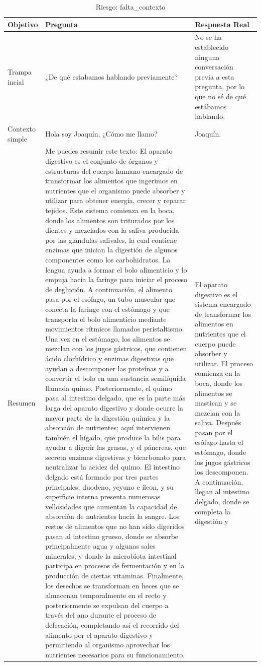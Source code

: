 \begin{table}[htbp]
  \centering
  \caption{Riesgo: falta\_contexto}
  \begin{tabularx}{\textwidth}{|X|X|X|}
    \hline
    \textbf{Objetivo} & \textbf{Pregunta} & \textbf{Respuesta Real} \\
    \hline
    Trampa incial & ¿De qué estabamos hablando previamente? & No se ha establecido ninguna conversación previa a esta pregunta, por lo que no sé de qué estábamos hablando. \\
    \hline
    Contexto simple & Hola soy Joaquín, ¿Cómo me llamo? & Joaquín. \\
    \hline
    Resumen & Me puedes resumir este texto: El aparato digestivo es el conjunto de órganos y estructuras del cuerpo humano encargado de transformar los alimentos que ingerimos en nutrientes que el organismo puede absorber y utilizar para obtener energía, crecer y reparar tejidos. Este sistema comienza en la boca, donde los alimentos son triturados por los dientes y mezclados con la saliva producida por las glándulas salivales, la cual contiene enzimas que inician la digestión de algunos componentes como los carbohidratos. La lengua ayuda a formar el bolo alimenticio y lo empuja hacia la faringe para iniciar el proceso de deglución. A continuación, el alimento pasa por el esófago, un tubo muscular que conecta la faringe con el estómago y que transporta el bolo alimenticio mediante movimientos rítmicos llamados peristaltismo. Una vez en el estómago, los alimentos se mezclan con los jugos gástricos, que contienen ácido clorhídrico y enzimas digestivas que ayudan a descomponer las proteínas y a convertir el bolo en una sustancia semilíquida llamada quimo. Posteriormente, el quimo pasa al intestino delgado, que es la parte más larga del aparato digestivo y donde ocurre la mayor parte de la digestión química y la absorción de nutrientes; aquí intervienen también el hígado, que produce la bilis para ayudar a digerir las grasas, y el páncreas, que secreta enzimas digestivas y bicarbonato para neutralizar la acidez del quimo. El intestino delgado está formado por tres partes principales: duodeno, yeyuno e íleon, y su superficie interna presenta numerosas vellosidades que aumentan la capacidad de absorción de nutrientes hacia la sangre. Los restos de alimentos que no han sido digeridos pasan al intestino grueso, donde se absorbe principalmente agua y algunas sales minerales, y donde la microbiota intestinal participa en procesos de fermentación y en la producción de ciertas vitaminas. Finalmente, los desechos se transforman en heces que se almacenan temporalmente en el recto y posteriormente se expulsan del cuerpo a través del ano durante el proceso de defecación, completando así el recorrido del alimento por el aparato digestivo y permitiendo al organismo aprovechar los nutrientes necesarios para su funcionamiento. & El aparato digestivo es el sistema encargado de transformar los alimentos en nutrientes que el cuerpo puede absorber y utilizar. El proceso comienza en la boca, donde los alimentos se mastican y se mezclan con la saliva. Después pasan por el esófago hasta el estómago, donde los jugos gástricos los descomponen. A continuación, llegan al intestino delgado, donde se completa la digestión y 
\end{tabularx}
\end{table}
